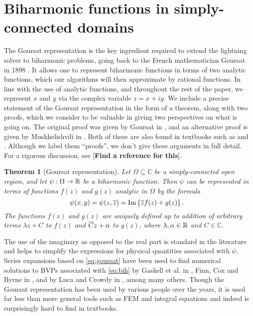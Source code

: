 \newtheorem{theorem}{Theorem}

\section{Biharmonic functions in simply-connected domains \label{sec:goursat}}

The Goursat representation is the key ingredient required to extend the lightning solver to biharmonic problems, going back to the French mathematician Goursat in 1898 \cite{goursat}. It allows one to represent biharmonic functions in terms of two analytic functions, which our algorithms will then approximate by rational functions. In line with the use of analytic functions, and throughout the rest of the paper, we represent $x$ and $y$ via the complex variable $z = x + iy$. We include a precise statement of the Goursat representation in the form of a theorem, along with two proofs, which we consider to be valuable in giving two perspectives on what is going on. The original proof was given by Goursat in \cite{goursat}, and an alternative proof is given by Muskhelishvili in \cite{mus19}. Both of these are also found in textbooks such as \cite{ockendon95} and \cite{mus77}. Although we label them ``proofs'', we don’t give these arguments in full detail. For a rigorous discussion, see [\textbf{Find a reference for this}].


\begin{theorem}[Goursat representation]
\label{th:goursat}
Let $\Omega\subseteq\mathbb{C}$ be a simply-connected open region, and let
$\psi : \Omega \rightarrow \mathbb{R}$ be a biharmonic function. Then $\psi$ can be represented in terms of functions $f(z)$ and $g(z)$ analytic in $\Omega$ by the formula
\begin{equation}\label{eq:goursat}
\psi(x,y) = \psi(z,{\overline{z}}) = \Im \left\{ {\overline{z}}f(z) + g(z)\right\}.
\end{equation}
The functions $f(z)$ and $g(z)$ are uniquely defined up to addition of arbitrary terms $\lambda z+C$ to $f(z)$ and ${\overline{C}}z+\alpha$ to $g(z)$, where $\lambda,\alpha\in\mathbb{R}$ and $C\in\mathbb{C}$.
\end{theorem}

The use of the imaginary as opposed to the real part is standard in the literature and helps
to simplify the expressions for physical quantities associated with $\psi$. Series expansions based on
\eqref{eq:goursat} have been used to find numerical solutions to BVPs associated with \eqref{eq:bih} by Gaskell et al. in
\cite{gaskell}, Finn, Cox and Byrne in \cite{finn}, and by Luca and Crowdy in \cite{luca18}, among many others. Though
the Goursat representation has been used by various people over the years, it is used far less than more general tools such as FEM and integral equations and indeed is surprisingly hard to find in textbooks.


